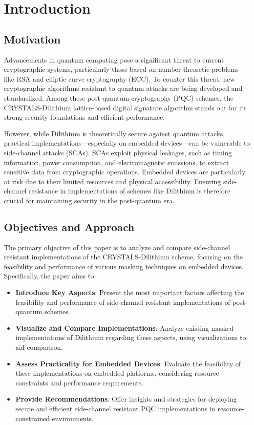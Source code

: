 
\chapter{Introduction}
\thispagestyle{chapterstart}

\section{Motivation}

Advancements in quantum computing pose a significant threat to current cryptographic systems, particularly those based on number-theoretic problems like RSA and elliptic curve cryptography (ECC). To counter this threat, new cryptographic algorithms resistant to quantum attacks are being developed and standardized. Among these post-quantum cryptography (PQC) schemes, the CRYSTALS-Dilithium lattice-based digital signature algorithm stands out for its strong security foundations and efficient performance.

However, while Dilithium is theoretically secure against quantum attacks, practical implementations—especially on embedded devices—can be vulnerable to side-channel attacks (SCAs). SCAs exploit physical leakages, such as timing information, power consumption, and electromagnetic emissions, to extract sensitive data from cryptographic operations. Embedded devices are particularly at risk due to their limited resources and physical accessibility. Ensuring side-channel resistance in implementations of schemes like Dilithium is therefore crucial for maintaining security in the post-quantum era.

\section{Objectives and Approach}

The primary objective of this paper is to analyze and compare side-channel resistant implementations of the CRYSTALS-Dilithium scheme, focusing on the feasibility and performance of various masking techniques on embedded devices. Specifically, the paper aims to:

\begin{itemize}
    \item \textbf{Introduce Key Aspects}: Present the most important factors affecting the feasibility and performance of side-channel resistant implementations of post-quantum schemes.
    \item \textbf{Visualize and Compare Implementations}: Analyze existing masked implementations of Dilithium regarding these aspects, using visualizations to aid comparison.
    \item \textbf{Assess Practicality for Embedded Devices}: Evaluate the feasibility of these implementations on embedded platforms, considering resource constraints and performance requirements.
    \item \textbf{Provide Recommendations}: Offer insights and strategies for deploying secure and efficient side-channel resistant PQC implementations in resource-constrained environments.
\end{itemize}

